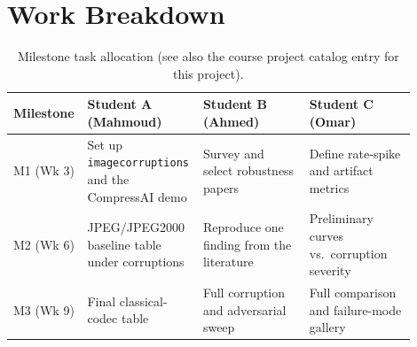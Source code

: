 \documentclass[11pt]{article}
\begin{document}
\section{Work Breakdown}
\label{sec:workbreakdown}
\begin{table}[h]
\centering
\caption{Milestone task allocation (see also the course project catalog entry for this
project).}
\label{tab:tasks}
\begin{tabular}{@{}p{0.12\linewidth}p{0.26\linewidth}p{0.26\linewidth}p{0.26\linewidth}@{}}
\toprule
\textbf{Milestone} & \textbf{Student A (Mahmoud)} & \textbf{Student B (Ahmed)} & \textbf{Student C (Omar)} \\
\midrule
M1 (Wk 3) & Set up \texttt{imagecorruptions} and the CompressAI demo & Survey and select robustness papers & Define rate-spike and artifact metrics \\
M2 (Wk 6) & JPEG/JPEG2000 baseline table under corruptions & Reproduce one finding from the literature & Preliminary curves vs.\ corruption severity \\
M3 (Wk 9) & Final classical-codec table & Full corruption and adversarial sweep & Full comparison and failure-mode gallery \\
\bottomrule
\end{tabular}
\end{table}



\end{document}
